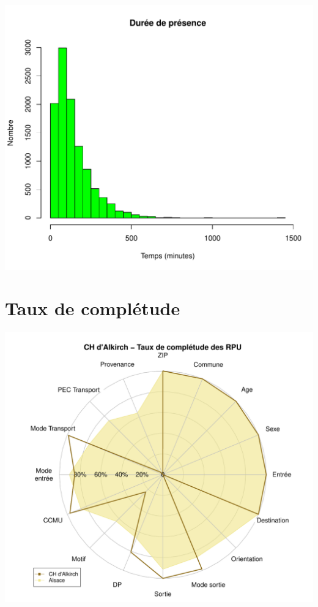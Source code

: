 \documentclass[12pt,english,french,twoside]{book}\usepackage[]{graphicx}\usepackage[]{color}
\makeatletter
\def\maxwidth{ %
  \ifdim\Gin@nat@width>\linewidth
    \linewidth
  \else
    \Gin@nat@width
  \fi
}
\newenvironment{knitrout}{}{} %
\makeatother
\begin{document}
\begin{knitrout}
\color{fgcolor}
\includegraphics[width=\maxwidth]{figure/graphe_p_alk-1} 

\end{knitrout}

\section*{Taux de complétude}

\begin{knitrout}
\color{fgcolor}
\includegraphics[width=\maxwidth]{figure/compl_alk-1} 

\end{knitrout}
\end{document}

